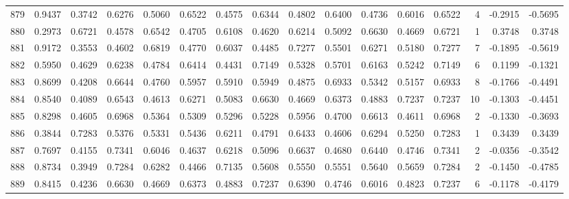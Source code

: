 \begin{tabular}{lrrrrrrrrrrrrrrr}
879 &      0.9437 &  0.3742 &  0.6276 &  0.5060 &  0.6522 &  0.4575 &  0.6344 &  0.4802 &  0.6400 &  0.4736 &   0.6016 &     0.6522 &      4 &                   -0.2915 &                    -0.5695 \\
880 &      0.2973 &  0.6721 &  0.4578 &  0.6542 &  0.4705 &  0.6108 &  0.4620 &  0.6214 &  0.5092 &  0.6630 &   0.4669 &     0.6721 &      1 &                    0.3748 &                     0.3748 \\
881 &      0.9172 &  0.3553 &  0.4602 &  0.6819 &  0.4770 &  0.6037 &  0.4485 &  0.7277 &  0.5501 &  0.6271 &   0.5180 &     0.7277 &      7 &                   -0.1895 &                    -0.5619 \\
882 &      0.5950 &  0.4629 &  0.6238 &  0.4784 &  0.6414 &  0.4431 &  0.7149 &  0.5328 &  0.5701 &  0.6163 &   0.5242 &     0.7149 &      6 &                    0.1199 &                    -0.1321 \\
883 &      0.8699 &  0.4208 &  0.6644 &  0.4760 &  0.5957 &  0.5910 &  0.5949 &  0.4875 &  0.6933 &  0.5342 &   0.5157 &     0.6933 &      8 &                   -0.1766 &                    -0.4491 \\
884 &      0.8540 &  0.4089 &  0.6543 &  0.4613 &  0.6271 &  0.5083 &  0.6630 &  0.4669 &  0.6373 &  0.4883 &   0.7237 &     0.7237 &     10 &                   -0.1303 &                    -0.4451 \\
885 &      0.8298 &  0.4605 &  0.6968 &  0.5364 &  0.5309 &  0.5296 &  0.5228 &  0.5956 &  0.4700 &  0.6613 &   0.4611 &     0.6968 &      2 &                   -0.1330 &                    -0.3693 \\
886 &      0.3844 &  0.7283 &  0.5376 &  0.5331 &  0.5436 &  0.6211 &  0.4791 &  0.6433 &  0.4606 &  0.6294 &   0.5250 &     0.7283 &      1 &                    0.3439 &                     0.3439 \\
887 &      0.7697 &  0.4155 &  0.7341 &  0.6046 &  0.4637 &  0.6218 &  0.5096 &  0.6637 &  0.4680 &  0.6440 &   0.4746 &     0.7341 &      2 &                   -0.0356 &                    -0.3542 \\
888 &      0.8734 &  0.3949 &  0.7284 &  0.6282 &  0.4466 &  0.7135 &  0.5608 &  0.5550 &  0.5551 &  0.5640 &   0.5659 &     0.7284 &      2 &                   -0.1450 &                    -0.4785 \\
889 &      0.8415 &  0.4236 &  0.6630 &  0.4669 &  0.6373 &  0.4883 &  0.7237 &  0.6390 &  0.4746 &  0.6016 &   0.4823 &     0.7237 &      6 &                   -0.1178 &                    -0.4179 \\

\end{tabular}
